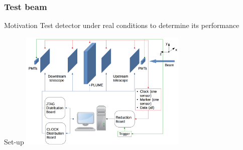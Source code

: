 \documentclass{beamer}
\begin{document}
  \begin{frame}
    \frametitle{Test beam}

    \begin{block}{Motivation}
      Test detector under real conditions to determine its performance
    \end{block}
      
    \begin{exampleblock}{Set-up}
      \centering
      \includegraphics[width = 0.6\textwidth]{Pictures/testBeamAcquisition.png}
    \end{exampleblock}
  
  \end{frame}
\end{document}
